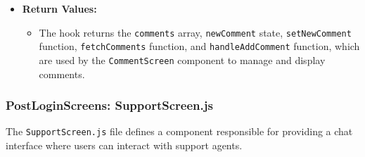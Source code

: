 \begin{itemize}
    \item \textbf{Return Values:}
    \begin{itemize}
        \item The hook returns the \texttt{comments} array, \texttt{newComment} state, \texttt{setNewComment} function, \texttt{fetchComments} function, and \texttt{handleAddComment} function, which are used by the \texttt{CommentScreen} component to manage and display comments.
    \end{itemize}
\end{itemize}

\subsubsection{PostLoginScreens: SupportScreen.js}

The \texttt{SupportScreen.js} file defines a component responsible for providing a chat interface where users can interact with support agents.

